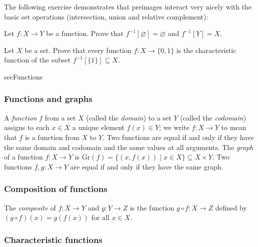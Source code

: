 The following exercise demonstrates that preimages interact very nicely with the basic set operations (intersection, union and relative complement):

\begin{exercise}
Let $f : X \to Y$ be a function. Prove that $f^{-1}[\varnothing] = \varnothing$ and $f^{-1}[Y]=X$.
\end{exercise}

\begin{exercise}
\label{exCharacteristicFunctionsCorrespondWithSubsets}
Let $X$ be a set. Prove that every function $f : X \to \{0,1\}$ is the characteristic function of the subset $f^{-1}[\{1\}] \subseteq X$.
\end{exercise}

\begin{tldr}{secFunctions}

\subsubsection*{Functions and graphs}

\begin{tldrlist}
 A \textit{function} $f$ from a set $X$ (called the \textit{domain}) to a set $Y$ (called the \textit{codomain}) assigns to each $x \in X$ a unique element $f(x) \in Y$; we write $f : X \to Y$ to mean that $f$ is a function from $X$ to $Y$.
 Two functions are equal if and only if they have the same domain and codomain and the same values at all arguments.
 The \textit{graph} of a function $f : X \to Y$ is $\mathrm{Gr}(f) = \{ (x,f(x)) \mid x \in X \} \subseteq X \times Y$. Two functions $f,g : X \to Y$ are equal if and only if they have the same graph.
\end{tldrlist}

\subsubsection*{Composition of functions}

\begin{tldrlist}
 The \textit{composite} of $f : X \to Y$ and $g : Y \to Z$ is the function $g \circ f : X \to Z$ defined by $(g \circ f)(x) = g(f(x))$ for all $x \in X$.
\end{tldrlist}

\subsubsection*{Characteristic functions}


\end{tldr}
